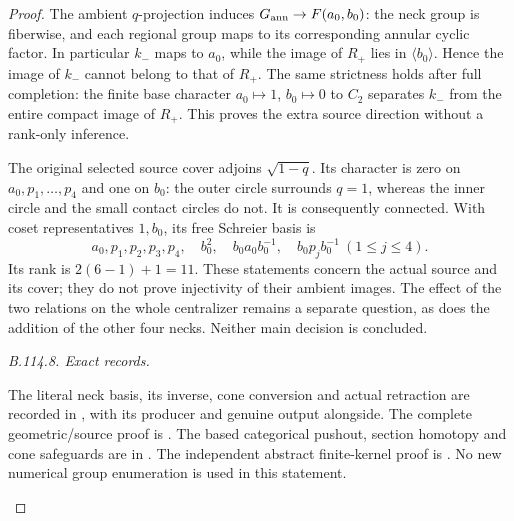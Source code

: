 \begin{proof}
The ambient $q$-projection induces
$G_{\rm ann}\to F(a_0,b_0)$: the neck group is fiberwise,
and each regional group maps to its corresponding annular
cyclic factor. In particular $k_-$ maps to $a_0$, while the
image of $R_+$ lies in $\langle b_0\rangle$. Hence the image
of $k_-$ cannot belong to that of $R_+$. The same strictness
holds after full completion: the finite base character
$a_0\mapsto1$, $b_0\mapsto0$ to $C_2$ separates $k_-$ from
the entire compact image of $\widehat R_+$. This proves the
extra source direction without a rank-only inference.

The original selected source cover adjoins $\sqrt{1-q}$. Its
character is zero on $a_0,p_1,\ldots,p_4$ and one on $b_0$:
the outer circle surrounds $q=1$, whereas the inner circle and
the small contact circles do not. It is consequently connected.
With coset representatives $1,b_0$, its free Schreier basis is
\[
 a_0,p_1,p_2,p_3,p_4,\quad b_0^2,\quad
 b_0a_0b_0^{-1},\quad b_0p_jb_0^{-1}\ (1\leq j\leq4).
\]
Its rank is $2(6-1)+1=11$. These statements concern the actual
source and its cover; they do not prove injectivity of their
ambient images. The effect of the two relations on the whole
centralizer remains a separate question, as does the addition
of the other four necks. Neither main decision is concluded.

\emph{B.114.8. Exact records.}
\begin{raggedright}
The literal neck basis, its inverse, cone conversion and actual
retraction are recorded in
,
with its producer and genuine output alongside. The complete
geometric/source proof is
.
The based categorical pushout, section homotopy and cone safeguards
are in .
The independent abstract finite-kernel proof is
.
No new numerical group enumeration is used in this statement.
\par\end{raggedright}
\end{proof}

